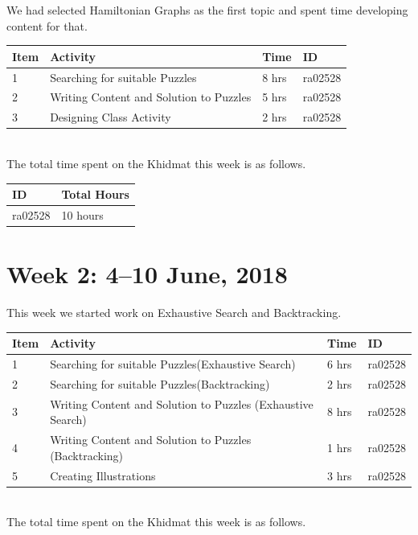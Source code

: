 \documentclass{article}
\begin{document}
We had selected Hamiltonian Graphs as the first topic and spent time developing content for that.\\

\begin{tabular}{|l|l|l|l|}
    \hline
  Item 	& Activity & Time & ID \\\hline\hline
  1	& Searching for suitable Puzzles & 8 hrs & ra02528 \\\hline
  2	& Writing Content and Solution to Puzzles & 5 hrs & ra02528 \\\hline
  3	& Designing Class Activity & 2 hrs & ra02528 \\\hline
\end{tabular}\\


The total time spent on the Khidmat this week is as follows.

\begin{tabular}{|l|l|}
  \hline
  ID & Total Hours\\\hline\hline
  ra02528 & 10 hours\\\hline
\end{tabular}

\newpage %
\section*{Week 2: 4--10 June, 2018}
This week we started work on Exhaustive Search and Backtracking.\\

\begin{tabular}{|l|l|l|l|}
  \hline
  Item 	& Activity & Time & ID \\\hline\hline
  1	& Searching for suitable Puzzles(Exhaustive Search) & 6 hrs & ra02528 \\\hline
  2	& Searching for suitable Puzzles(Backtracking) & 2 hrs & ra02528 \\\hline
  3	& Writing Content and Solution to Puzzles (Exhaustive Search)& 8 hrs & ra02528 \\\hline
  4	& Writing Content and Solution to Puzzles (Backtracking)& 1 hrs & ra02528 \\\hline
  5	& Creating Illustrations & 3 hrs & ra02528 \\\hline
\end{tabular}\\

The total time spent on the Khidmat this week is as follows.
\end{document}
